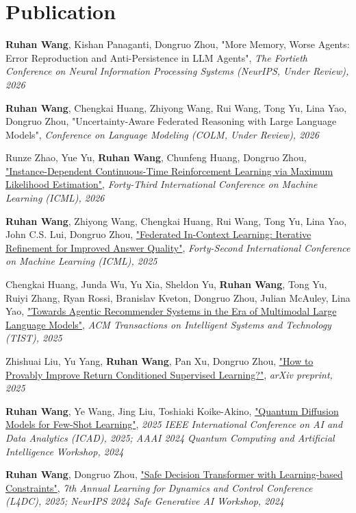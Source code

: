 \documentclass[letterpaper,10.8pt]{article}
\begin{document}
\section{Publication}
\begin{description}[font=$\bullet$]
\item {\textbf{Ruhan Wang}, Kishan Panaganti, Dongruo Zhou, "More Memory, Worse Agents: Error Reproduction and Anti-Persistence in LLM Agents", \textit{The Fortieth Conference on Neural Information Processing Systems (NeurIPS, Under Review), 2026}}
\item {\textbf{Ruhan Wang}, Chengkai Huang, Zhiyong Wang, Rui Wang, Tong Yu, Lina Yao, Dongruo Zhou, "Uncertainty-Aware Federated Reasoning with Large Language Models", \textit{Conference on Language Modeling (COLM, Under Review), 2026}}
\item {Runze Zhao, Yue Yu, \textbf{Ruhan Wang}, Chunfeng Huang, Dongruo Zhou, \href{https://arxiv.org/abs/2508.02103}{"Instance-Dependent Continuous-Time Reinforcement Learning via Maximum Likelihood Estimation"}, \textit{Forty-Third International Conference on Machine Learning (ICML), 2026}}
\item {\textbf{Ruhan Wang}, Zhiyong Wang, Chengkai Huang, Rui Wang, Tong Yu, Lina Yao, John C.S. Lui, Dongruo Zhou, \href{https://arxiv.org/abs/2506.07440}{"Federated In-Context Learning: Iterative Refinement for Improved Answer Quality"}, \textit{Forty-Second International Conference on Machine Learning (ICML), 2025}}
\item {Chengkai Huang, Junda Wu, Yu Xia, Sheldon Yu, \textbf{Ruhan Wang}, Tong Yu, Ruiyi Zhang, Ryan Rossi, Branislav Kveton, Dongruo Zhou, Julian McAuley, Lina Yao, \href{https://arxiv.org/abs/2503.16734}{"Towards Agentic Recommender Systems in the Era of Multimodal Large Language Models"}, \textit{ACM Transactions on Intelligent Systems and Technology (TIST), 2025}}
\item {Zhishuai Liu, Yu Yang, \textbf{Ruhan Wang}, Pan Xu, Dongruo Zhou, \href{https://arxiv.org/abs/2506.08463}{"How to Provably Improve Return Conditioned Supervised Learning?"}, \textit{arXiv preprint, 2025}}
\item {\textbf{Ruhan Wang}, Ye Wang, Jing Liu, Toshiaki Koike-Akino, \href{https://arxiv.org/abs/2411.04217}{"Quantum Diffusion Models for Few-Shot Learning"}, \textit{2025 IEEE International Conference on AI and Data Analytics (ICAD), 2025; AAAI 2024 Quantum Computing and Artificial Intelligence Workshop, 2024}}
\item {\textbf{Ruhan Wang}, Dongruo Zhou, \href{https://proceedings.mlr.press/v283/wang25a.html}{"Safe Decision Transformer with Learning-based Constraints"}, \textit{7th Annual Learning for Dynamics and Control Conference (L4DC), 2025; NeurIPS 2024 Safe Generative AI Workshop, 2024}}

\end{description}
\end{document}
